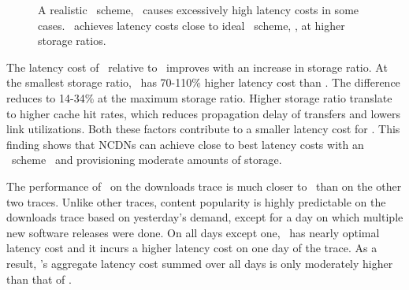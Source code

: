 \begin{figure}[t]
\begin{center}
\end{center}
\vspace{-0.2in}
\caption{ A realistic \planned\ scheme, \optrpl\ causes excessively high latency costs in some cases. \invlru\ achieves latency costs close to ideal \planned\ scheme, \optrpfuturel,  at higher storage ratios.}
\vspace{-0.2in}
\label{fig:latencygraphs}
\end{figure}




The latency cost of \invlru\ relative to \optrpfuturel\ improves with an increase in storage ratio. At the smallest storage ratio, \invlru\  has 70-110\% higher latency cost than \optrpfuturel. The difference reduces to  14-34\% at the maximum storage ratio. Higher storage ratio translate to higher cache hit rates, which reduces propagation delay of transfers and lowers link utilizations. Both these factors contribute to  a smaller latency cost for \invlru. 
This finding shows that NCDNs can achieve close to best latency costs with an \unplanned\ scheme \invlru\ and provisioning moderate amounts of storage.

The performance of \optrpl\ on the downloads trace is much closer to \optrpfuturel\ than on the other two traces. 
Unlike other traces, content popularity is highly predictable on the downloads trace based on yesterday's demand, except for a day on which multiple new software releases were done.  On all days except one,  \optrpl\ has nearly optimal latency cost and it incurs a higher latency cost on one day of the trace. As a result, \optrpl's aggregate latency cost summed over all days is only moderately higher than that of \optrpfuturel. 



